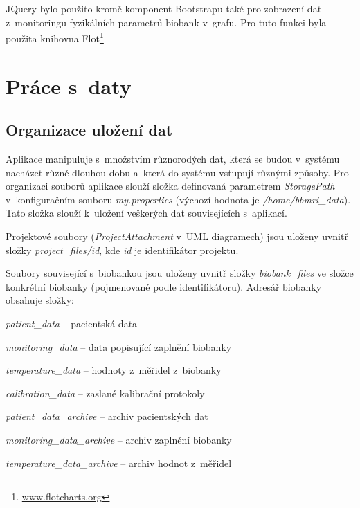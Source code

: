 \documentclass[11pt,draft,oneside]{fithesis2}
\begin{document}
JQuery bylo použito kromě komponent Bootstrapu také pro zobrazení dat z~monitoringu fyzikálních parametrů biobank v~grafu. Pro tuto funkci byla použita knihovna Flot\footnote{\url{www.flotcharts.org}} 


\section{Práce s~daty}

\subsection{Organizace uložení dat}\label{chapter:implementation:subsection:organizationOfDataStorage}
Aplikace manipuluje s~množstvím různorodých dat, která se budou v~systému nacházet různě dlouhou dobu a~která do systému vstupují různými způsoby. Pro organizaci souborů aplikace slouží složka definovaná parametrem \textit{StoragePath} v~konfiguračním souboru \textit{my.properties} (výchozí hodnota je \textit{/home/bbmri\_data}). Tato složka slouží k~uložení veškerých dat souvisejících s~aplikací.

Projektové soubory (\textit{ProjectAttachment} v~UML diagramech) jsou uloženy uvnitř složky \textit{project\_files/id}, kde \textit{id} je identifikátor projektu. 

Soubory související s~biobankou jsou uloženy uvnitř složky \textit{biobank\_files} ve složce konkrétní biobanky (pojmenované podle identifikátoru). Adresář biobanky obsahuje složky: 
\begin{compactitem}
	\item \textit{patient\_data} -- pacientská data
	\item \textit{monitoring\_data} -- data popisující zaplnění biobanky
	\item \textit{temperature\_data} -- hodnoty z~měřidel z~biobanky
	\item \textit{calibration\_data} -- zaslané kalibrační protokoly
	\item \textit{patient\_data\_archive} -- archiv pacientských dat
	\item \textit{monitoring\_data\_archive} -- archiv zaplnění biobanky
	\item \textit{temperature\_data\_archive} -- archiv hodnot z~měřidel
\end{compactitem}
\end{document}
